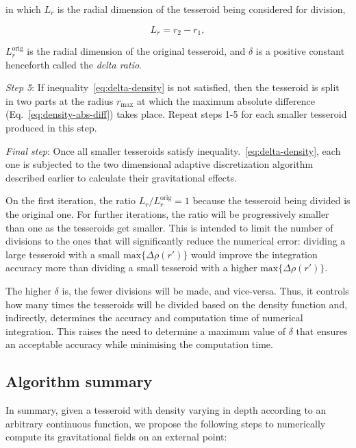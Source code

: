 \documentclass[extra, referee]{gji}
\begin{document}
\noindent
in which $L_r$ is the radial dimension of the tesseroid being considered for division,

\begin{equation}
    L_r = r_2 - r_1,
\end{equation}

\noindent $L_r^\text{orig}$ is the radial dimension of the original tesseroid, and
$\delta$ is a positive constant henceforth called the \textit{delta ratio}.

\textit{Step 5}:
If inequality~\ref{eq:delta-density} is not satisfied, then the tesseroid is split in
two parts at the radius $r_\text{max}$ at which the maximum absolute difference
(Eq.~\ref{eq:density-abs-diff}) takes place.
Repeat steps 1-5 for each smaller tesseroid produced in this step.

\textit{Final step}:
Once all smaller tesseroids satisfy inequality.~\ref{eq:delta-density}, each one is
subjected to the two dimensional adaptive discretization algorithm described earlier to
calculate their gravitational effects.

On the first iteration, the ratio $L_r/L_r^\text{orig} = 1$ because the tesseroid being
divided is the original one.
For further iterations, the ratio will be progressively smaller than one as the
tesseroids get smaller.
This is intended to limit the number of divisions to the ones that will
significantly reduce the numerical error:
dividing a large tesseroid with a small $\text{max}\{ \Delta \rho(r') \}$ would
improve the integration accuracy more than dividing a small tesseroid with a
higher $\text{max}\{ \Delta \rho(r') \}$.

The higher $\delta$ is, the fewer divisions will be made, and vice-versa.
Thus, it controls how many times the tesseroids will be divided based on the density
function and, indirectly, determines the accuracy and computation time of
numerical integration.
This raises the need to determine a maximum value of $\delta$ that
ensures an acceptable accuracy while minimising the computation time.


\subsection{Algorithm summary}

In summary, given a tesseroid with density varying in depth according to an arbitrary
continuous function, we propose the following steps to numerically compute its
gravitational fields on an external point:
\end{document}
